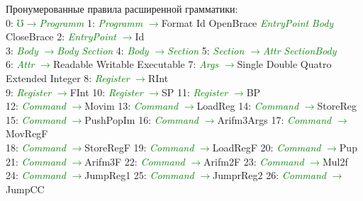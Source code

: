 \documentclass[a0]{a0poster}
\begin{document}
Пронумерованные правила расширенной грамматики:\\
0: \textcolor{Green}{$\mho$}\textcolor{Green}{$\to$}\textcolor{Green}{\textit{Programm}} 1: \textcolor{Green}{\textit{Programm}} \textcolor{Green}{$\to$}Format Id OpenBrace \textcolor{Green}{\textit{EntryPoint}} \textcolor{Green}{\textit{Body}} CloseBrace 2: \textcolor{Green}{\textit{EntryPoint}} \textcolor{Green}{$\to$}Id \\
3: \textcolor{Green}{\textit{Body}} \textcolor{Green}{$\to$}\textcolor{Green}{\textit{Body}} \textcolor{Green}{\textit{Section}} 4: \textcolor{Green}{\textit{Body}} \textcolor{Green}{$\to$}\textcolor{Green}{\textit{Section}} 5: \textcolor{Green}{\textit{Section}} \textcolor{Green}{$\to$}\textcolor{Green}{\textit{Attr}} \textcolor{Green}{\textit{SectionBody}} \\
6: \textcolor{Green}{\textit{Attr}} \textcolor{Green}{$\to$}Readable Writable Executable 7: \textcolor{Green}{\textit{Args}} \textcolor{Green}{$\to$}Single Double Quatro Extended Integer 8: \textcolor{Green}{\textit{Register}} \textcolor{Green}{$\to$}RInt \\
9: \textcolor{Green}{\textit{Register}} \textcolor{Green}{$\to$}FInt 10: \textcolor{Green}{\textit{Register}} \textcolor{Green}{$\to$}SP 11: \textcolor{Green}{\textit{Register}} \textcolor{Green}{$\to$}BP \\
12: \textcolor{Green}{\textit{Command}} \textcolor{Green}{$\to$}Movim 13: \textcolor{Green}{\textit{Command}} \textcolor{Green}{$\to$}LoadReg 14: \textcolor{Green}{\textit{Command}} \textcolor{Green}{$\to$}StoreReg \\
15: \textcolor{Green}{\textit{Command}} \textcolor{Green}{$\to$}PushPopIm 16: \textcolor{Green}{\textit{Command}} \textcolor{Green}{$\to$}Arifm3Args 17: \textcolor{Green}{\textit{Command}} \textcolor{Green}{$\to$}MovRegF \\
18: \textcolor{Green}{\textit{Command}} \textcolor{Green}{$\to$}StoreRegF 19: \textcolor{Green}{\textit{Command}} \textcolor{Green}{$\to$}LoadRegF 20: \textcolor{Green}{\textit{Command}} \textcolor{Green}{$\to$}Pup \\
21: \textcolor{Green}{\textit{Command}} \textcolor{Green}{$\to$}Arifm3F 22: \textcolor{Green}{\textit{Command}} \textcolor{Green}{$\to$}Arifm2F 23: \textcolor{Green}{\textit{Command}} \textcolor{Green}{$\to$}Mul2f \\
24: \textcolor{Green}{\textit{Command}} \textcolor{Green}{$\to$}JumpReg1 25: \textcolor{Green}{\textit{Command}} \textcolor{Green}{$\to$}JumprReg2 26: \textcolor{Green}{\textit{Command}} \textcolor{Green}{$\to$}JumpCC \\
\end{document}
